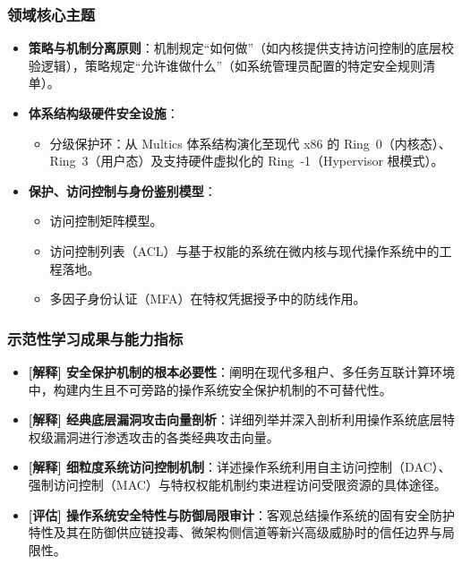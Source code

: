 \subsubsection{领域核心主题}
\begin{itemize}\setlength{\itemsep}{0pt}\setlength{\parskip}{0pt}
    \item \textbf{策略与机制分离原则}：机制规定“如何做”（如内核提供支持访问控制的底层校验逻辑），策略规定“允许谁做什么”（如系统管理员配置的特定安全规则清单）。
    \item \textbf{体系结构级硬件安全设施}：
    \begin{itemize}\setlength{\itemsep}{0pt}\setlength{\parskip}{0pt}
        \item 分级保护环：从 Multics 体系结构演化至现代 x86 的 Ring~0（内核态）、Ring~3（用户态）及支持硬件虚拟化的 Ring~-1（Hypervisor 根模式）。
    \end{itemize}
    \item \textbf{保护、访问控制与身份鉴别模型}：
    \begin{itemize}\setlength{\itemsep}{0pt}\setlength{\parskip}{0pt}
        \item 访问控制矩阵模型。
        \item 访问控制列表（ACL）与基于权能的系统在微内核与现代操作系统中的工程落地。
        \item 多因子身份认证（MFA）在特权凭据授予中的防线作用。
    \end{itemize}
\end{itemize}

\subsubsection{示范性学习成果与能力指标}
\begin{itemize}\setlength{\itemsep}{0pt}\setlength{\parskip}{0pt}
    \item \textbf{[解释] 安全保护机制的根本必要性}：阐明在现代多租户、多任务互联计算环境中，构建内生且不可旁路的操作系统安全保护机制的不可替代性。
    \item \textbf{[解释] 经典底层漏洞攻击向量剖析}：详细列举并深入剖析利用操作系统底层特权级漏洞进行渗透攻击的各类经典攻击向量。
    \item \textbf{[解释] 细粒度系统访问控制机制}：详述操作系统利用自主访问控制（DAC）、强制访问控制（MAC）与特权权能机制约束进程访问受限资源的具体途径。
    \item \textbf{[评估] 操作系统安全特性与防御局限审计}：客观总结操作系统的固有安全防护特性及其在防御供应链投毒、微架构侧信道等新兴高级威胁时的信任边界与局限性。
\end{itemize}

